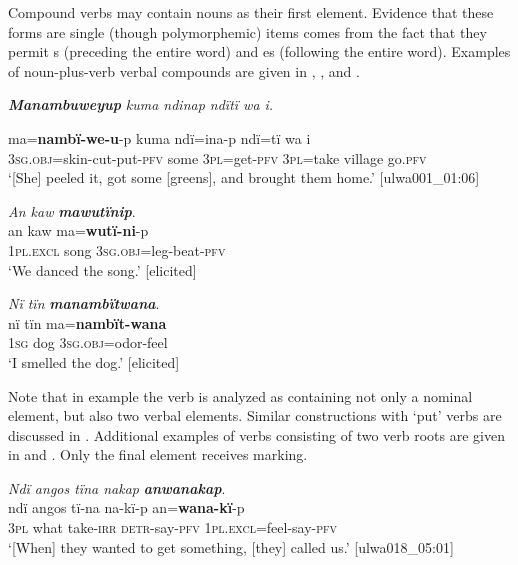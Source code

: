   Compound verbs may contain nouns as their first element. Evidence that these forms are single (though polymorphemic)  items comes from the fact that they permit s (preceding the entire word) and  es (following the entire word). Examples of noun-plus-verb verbal compounds are given in , , and .


\ea%
    \label{ex:verbs:98}

          \textbf{\textit{Manambuweyup}} \textit{kuma ndinap ndïtï wa i.}

\gll    ma=\textbf{nambï-we-u}{}-p      kuma  ndï=ina-p    ndï=tï    wa    i\\
    3\textsc{sg.obj}=skin-cut-put-\textsc{pfv}  some  3\textsc{pl}=get-\textsc{pfv}  3\textsc{pl}=take    village  go.\textsc{pfv}\\


\glt `[She] peeled it, got some [greens], and brought them home.’ [ulwa001\_01:06]
\z

\ea%
    \label{ex:verbs:99}
          \textit{An kaw} \textbf{\textit{mawutïnip}}.\\
\gll an      kaw  ma=\textbf{wutï-ni}{}-p\\
    1\textsc{pl.excl}  song  3\textsc{sg.obj}=leg-beat-\textsc{pfv}\\
\glt `We danced the song.’ [elicited]
\z

\ea%
    \label{ex:verbs:100}
          \textit{Nï tïn} \textbf{\textit{manambïtwana}}.\\
\gll nï    tïn    ma=\textbf{nambït-wana}\\
    1\textsc{sg}  dog  3\textsc{sg.obj}=odor-feel\\
\glt `I smelled the dog.’ [elicited]
\z

Note that in example  the verb is analyzed as containing not only a nominal element, but also two verbal elements. Similar constructions with ‘put’ verbs are discussed in . Additional examples of  verbs consisting of two verb roots are given in  and . Only the final element receives  marking.

\ea%
    \label{ex:verbs:101}
          \textit{Ndï angos tïna nakap} \textbf{\textit{anwanakap}}.\\
\gll ndï  angos  tï-na    na-kï{}-p      an=\textbf{wana-kï}{}-p\\
    3\textsc{pl}  what  take{}-\textsc{irr}  \textsc{detr}{}-say-\textsc{pfv}  1\textsc{pl.excl}=feel-say-\textsc{pfv}\\
\glt `[When] they wanted to get something, [they] called us.’ [ulwa018\_05:01]
\z


